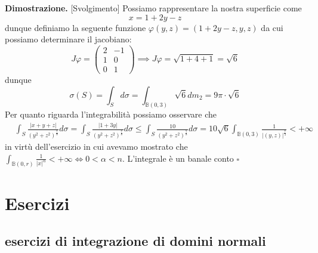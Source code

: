 %
\noindent \textbf{Dimostrazione. }[Svolgimento]
	Possiamo rappresentare la nostra superficie come
	$$
	x = 1 + 2y - z
	$$
	dunque definiamo la seguente funzione $\varphi(y, z) = (1+2y-z, y, z)$ da cui possiamo determinare il jacobiano:
	$$
	J\varphi = \begin{pmatrix}
		2 & -1 \\
		1 & 0 \\
		0 & 1
	\end{pmatrix} \implies J\varphi = \sqrt{1 + 4 + 1} = \sqrt{6}
	$$
	dunque
	$$
	\sigma(S) = \int_S d\sigma = \int_{\mathbb{B}(0, 3)} \sqrt{6} dm_2 = 9 \pi \cdot \sqrt{6} 
	$$
	Per quanto riguarda l'integrabilità possiamo osservare che
	\[\begin{aligned}
	&\int_S \frac{|x+y+z|}{(y^2 + z^2)^{\frac{7}{8}}}d\sigma = \int_S \frac{|1 + 3y|}{(y^2 + z^2)^{\frac{7}{8}}}d\sigma \leq \int_S \frac{10}{(y^2+z^2)^{\frac{7}{8}}} d\sigma = 10 \sqrt{6} \int_{\mathbb{B}(0, 3)} \frac{1}{|(y, z)|^{\frac{7}{4}}} < +\infty
	\end{aligned}\]
	in virtù dell'esercizio in cui avevamo mostrato che $\int_{\mathbb{B}(0, r)} \frac{1}{|x|^\alpha} < +\infty \iff 0 < \alpha < n$.
	L'integrale è un banale conto
\hfill $\square$

\vspace{0.5cm}
\section{Esercizi}

\subsection{esercizi di integrazione di domini normali}


